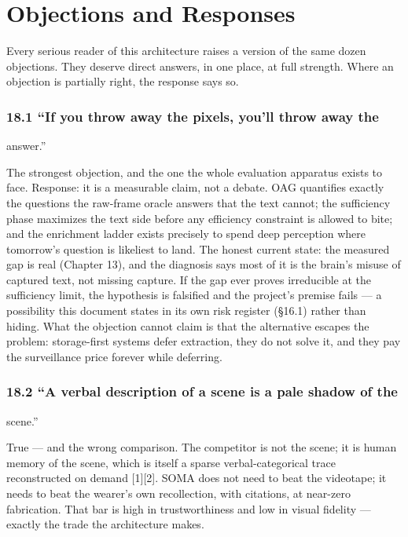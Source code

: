 \chapter{Objections and Responses}\label{objections-and-responses}

Every serious reader of this architecture raises a version of the same dozen objections. They deserve direct answers, in one place, at full strength. Where an objection is partially right, the response says so.

\subsection{18.1 ``If you throw away the pixels, you'll throw away the}\label{if-you-throw-away-the-pixels-youll-throw-away-the}

answer.''

The strongest objection, and the one the whole evaluation apparatus exists to face. Response: it is a measurable claim, not a debate. OAG quantifies exactly the questions the raw-frame oracle answers that the text cannot; the sufficiency phase maximizes the text side before any efficiency constraint is allowed to bite; and the enrichment ladder exists precisely to spend deep perception where tomorrow's question is likeliest to land. The honest current state: the measured gap is real (Chapter 13), and the diagnosis says most of it is the brain's misuse of captured text, not missing capture. If the gap ever proves irreducible at the sufficiency limit, the hypothesis is falsified and the project's premise fails --- a possibility this document states in its own risk register (\S{}16.1) rather than hiding. What the objection cannot claim is that the alternative escapes the problem: storage-first systems defer extraction, they do not solve it, and they pay the surveillance price forever while deferring.

\subsection{18.2 ``A verbal description of a scene is a pale shadow of the}\label{a-verbal-description-of-a-scene-is-a-pale-shadow-of-the}

scene.''

True --- and the wrong comparison. The competitor is not the scene; it is human memory of the scene, which is itself a sparse verbal-categorical trace reconstructed on demand {[}1{]}{[}2{]}. SOMA does not need to beat the videotape; it needs to beat the wearer's own recollection, with citations, at near-zero fabrication. That bar is high in trustworthiness and low in visual fidelity --- exactly the trade the architecture makes.

